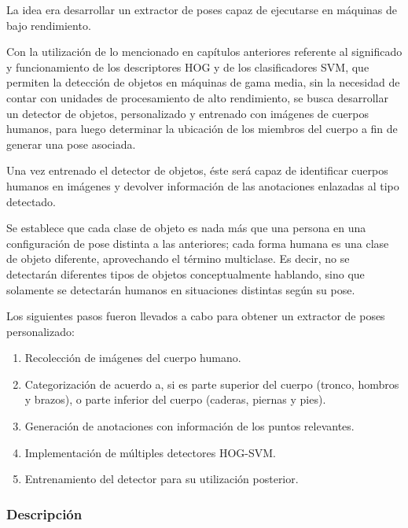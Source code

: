 \documentclass[a4paper,12pt,oneside,spanish]{book}
\begin{document}
La idea era desarrollar un extractor de poses capaz de ejecutarse en máquinas de bajo rendimiento.\par

Con la utilización de lo mencionado en capítulos anteriores referente al significado y funcionamiento de los descriptores HOG y de los clasificadores SVM, que permiten la detección de objetos en máquinas de gama media, sin la necesidad de contar con unidades de procesamiento de alto rendimiento, se busca desarrollar un detector de objetos, personalizado y entrenado con imágenes de cuerpos humanos, para luego determinar la ubicación de los miembros del cuerpo a fin de generar una pose asociada.\par

Una vez entrenado el detector de objetos, éste será capaz de identificar cuerpos humanos en imágenes y devolver información de las anotaciones enlazadas al tipo detectado. \par

Se establece que cada clase de objeto es nada más que una persona en una configuración de pose distinta a las anteriores; cada forma humana es una clase de objeto diferente, aprovechando el término multiclase. Es decir, no se detectarán diferentes tipos de objetos conceptualmente hablando, sino que solamente se detectarán humanos en situaciones distintas según su pose. \par

Los siguientes pasos fueron llevados a cabo para obtener un extractor de poses personalizado:

\begin{enumerate}
	\setlength\itemsep{-0.2em}
	\item Recolección de imágenes del cuerpo humano.
	\item Categorización de acuerdo a, si es parte superior del cuerpo (tronco, hombros y brazos), o parte inferior del cuerpo (caderas, piernas y pies).
	\item Generación de anotaciones con información de los puntos relevantes.
	\item Implementación de múltiples detectores HOG-SVM.
	\item Entrenamiento del detector para su utilización posterior.
\end{enumerate}

\subsubsection{Descripción}
\end{document}
